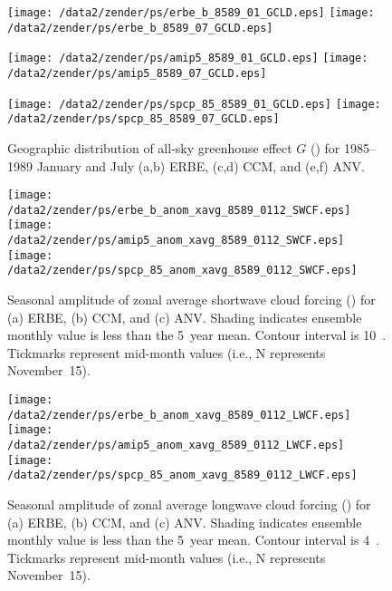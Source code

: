 \documentclass[twocolumn,final]{article}
\begin{document}
\begin{figure*}
\begin{center}
\texttt{[image: /data2/zender/ps/erbe\_b\_8589\_01\_GCLD.eps]}%
\texttt{[image: /data2/zender/ps/erbe\_b\_8589\_07\_GCLD.eps]}%

\texttt{[image: /data2/zender/ps/amip5\_8589\_01\_GCLD.eps]}%
\texttt{[image: /data2/zender/ps/amip5\_8589\_07\_GCLD.eps]}%

\texttt{[image: /data2/zender/ps/spcp\_85\_8589\_01\_GCLD.eps]}%
\texttt{[image: /data2/zender/ps/spcp\_85\_8589\_07\_GCLD.eps]}%
\end{center}
\caption[Geographic distribution of all-sky greenhouse effect $G$
for 1985--1989 January and July ERBE, CCM, and ANV]{
Geographic distribution of all-sky greenhouse effect $G$ (\wxmS) for
1985--1989 January and July (a,b) ERBE, (c,d) CCM, and (e,f) ANV.  
\label{fig:8589_GCLD}}   
\end{figure*}
\clearpage

\begin{figure}
\begin{center}
\texttt{[image: /data2/zender/ps/erbe\_b\_anom\_xavg\_8589\_0112\_SWCF.eps]}\vfill
\texttt{[image: /data2/zender/ps/amip5\_anom\_xavg\_8589\_0112\_SWCF.eps]}\vfill
\texttt{[image: /data2/zender/ps/spcp\_85\_anom\_xavg\_8589\_0112\_SWCF.eps]}\vfill
\end{center}
\caption[Seasonal amplitude of zonal average shortwave cloud forcing
SWCF for ERBE, CCM, and ANV]{
Seasonal amplitude of zonal average shortwave cloud 
forcing (\wxmS) for (a) ERBE, (b) CCM, and (c) ANV. 
Shading indicates ensemble monthly value is less than the 5~year
mean. 
Contour interval is 10~\wxmS.
Tickmarks represent mid-month values (i.e., N represents
November~15). 
\label{fig:anom_xavg_8589_0112_SWCF}}   
\end{figure}

\begin{figure}
\begin{center}
\texttt{[image: /data2/zender/ps/erbe\_b\_anom\_xavg\_8589\_0112\_LWCF.eps]}\vfill
\texttt{[image: /data2/zender/ps/amip5\_anom\_xavg\_8589\_0112\_LWCF.eps]}\vfill
\texttt{[image: /data2/zender/ps/spcp\_85\_anom\_xavg\_8589\_0112\_LWCF.eps]}\vfill
\end{center}
\caption[Seasonal amplitude of zonal average longwave cloud forcing 
LWCF for ERBE, CCM, and ANV]{
Seasonal amplitude of zonal average longwave cloud 
forcing (\wxmS) for (a) ERBE, (b) CCM, and (c) ANV. 
Shading indicates ensemble monthly value is less than the 5~year
mean. 
Contour interval is 4~\wxmS.
Tickmarks represent mid-month values (i.e., N represents
November~15). 
\label{fig:anom_xavg_8589_0112_LWCF}}   
\end{figure}
\clearpage
\end{document}
